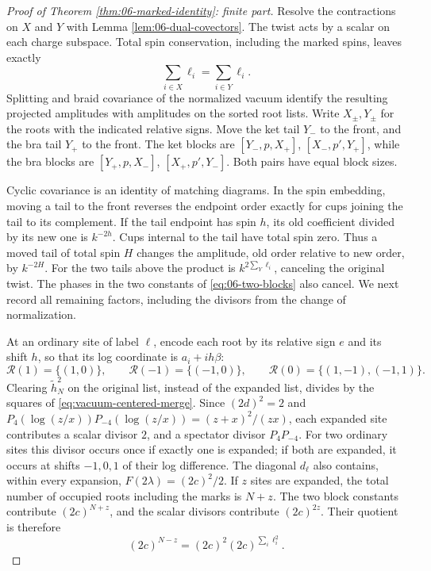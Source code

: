 \begin{proof}[Proof of Theorem \ref{thm:06-marked-identity}: finite part]
Resolve the contractions on \(X\) and \(Y\) with
Lemma \ref{lem:06-dual-covectors}.  The twist acts by a scalar on each
charge subspace.  Total spin conservation, including the marked
spins, leaves exactly
\[
 \sum_{i\in X}\ell_i=\sum_{i\in Y}\ell_i.
\]
Splitting and braid covariance of the normalized vacuum identify the
resulting projected amplitudes with amplitudes on the sorted root
lists.  Write \(X_\pm,Y_\pm\) for the roots with the indicated relative
signs.  Move the ket tail \(Y_-\) to the front, and the bra tail
\(Y_+\) to the front.  The ket blocks are
\([Y_-,p,X_+]\), \([X_-,p',Y_+]\), while the bra blocks are
\([Y_+,p,X_-]\), \([X_+,p',Y_-]\).
Both pairs have equal block sizes.

Cyclic covariance is an identity of matching diagrams.  In the spin
embedding, moving a tail to the front reverses the endpoint order
exactly for cups joining the tail to its complement. If the tail
endpoint has spin \(h\), its old coefficient divided by its new one
is \(k^{-2h}\). Cups internal to the tail have total spin zero.
Thus a moved tail of total spin \(H\) changes the amplitude, old
order relative to new order, by \(k^{-2H}\).
For the two tails above the product is
\(k^{2\sum_Y\ell_i}\), canceling the original twist.
The phases in the two constants of
\eqref{eq:06-two-blocks} also cancel.  We next record all remaining
factors, including the divisors from the change of normalization.

At an ordinary site of label \(\ell\), encode each root by its
relative sign \(e\) and its shift \(h\), so that its log coordinate is
\(a_i+ih\beta\):
\[
 \mathcal R(1)=\{(1,0)\},\qquad
 \mathcal R(-1)=\{(-1,0)\},\qquad
 \mathcal R(0)=\{(1,-1),(-1,1)\}.
\]
Clearing \(\widetilde h_N^2\) on the original list, instead of the
expanded list, divides by the squares of
\eqref{eq:vacuum-centered-merge}. Since \((2d)^2=2\) and
\(P_4(\log(z/x))P_{-4}(\log(z/x))=(z+x)^2/(zx)\), each
expanded site contributes a scalar divisor \(2\), and a spectator
divisor \(P_4P_{-4}\).  For two ordinary sites this divisor occurs
once if exactly one is expanded; if both are expanded, it occurs
at shifts \(-1,0,1\) of their log difference.
The diagonal \(d_\ell\) also contains, within every expansion,
\(F(2\lambda)=(2c)^2/2\).  If \(z\) sites are expanded, the total
number of occupied roots including the marks is \(N+z\).
The two block constants contribute \((2c)^{N+z}\), and the scalar
divisors contribute \((2c)^{2z}\).  Their quotient is therefore
\[
 (2c)^{N-z}=(2c)^2(2c)^{\sum_i\ell_i^2}.
\]


\end{proof}
